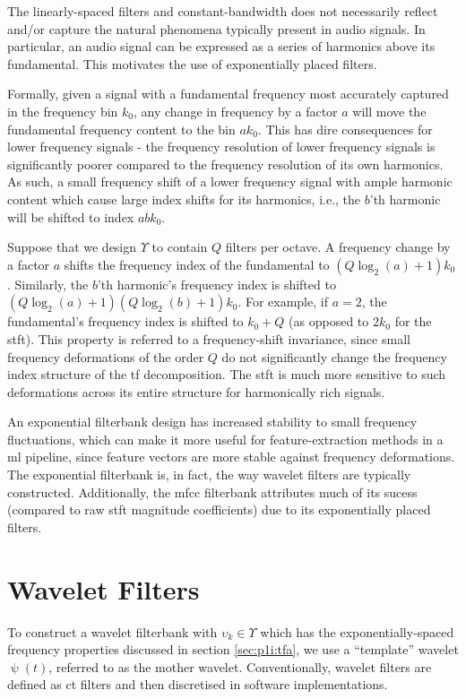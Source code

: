 The linearly-spaced filters and constant-bandwidth does not necessarily reflect and/or capture the natural phenomena typically present in audio signals. In particular, an audio signal can be expressed as a series of harmonics above its fundamental. This motivates the use of exponentially placed filters.

Formally, given a signal with a fundamental frequency most accurately captured in the frequency bin $k_0$, any change in frequency by a factor $a$ will move the fundamental frequency content to the bin $a k_0$. This has dire consequences for lower frequency signals - the frequency resolution of lower frequency signals is significantly poorer compared to the frequency resolution of its own harmonics. As such, a small frequency shift of a lower frequency signal with ample harmonic content which cause large index shifts for its harmonics, i.e., the $b$'th harmonic will be shifted to index $a b k_0$.

Suppose that we design $\Upsilon$ to contain $Q$ filters per octave. A frequency change by a factor $a$ shifts the frequency index of the fundamental to $(Q\log_2 (a) + 1) k_0$. Similarly, the $b$'th harmonic's frequency index is shifted to $(Q\log_2 (a) + 1) (Q\log_2 (b) + 1) k_0$. For example, if $a=2$, the fundamental's frequency index is shifted to $k_0 + Q$ (as opposed to $2 k_0$ for the \ac{stft}). This property is referred to a frequency-shift invariance, since small frequency deformations of the order $Q$ do not significantly change the frequency index structure of the \ac{tf} decomposition. The \ac{stft} is much more sensitive to such deformations across its entire structure for harmonically rich signals.

An exponential filterbank design has increased stability to small frequency fluctuations, which can make it more useful for feature-extraction methods in a \ac{ml} pipeline, since feature vectors are more stable against frequency deformations. The exponential filterbank is, in fact, the way wavelet filters are typically constructed. Additionally, the \ac{mfcc} filterbank attributes much of its sucess (compared to raw \ac{stft} magnitude coefficients) due to its exponentially placed filters.

\section{Wavelet Filters}
\label{sec:p1i:wavelets}

To construct a wavelet filterbank with $\upsilon_k \in \Upsilon$ which has the exponentially-spaced frequency properties discussed in section \ref{sec:p1i:tfa}, we use a ``template'' wavelet $\uppsi(t)$, referred to as the mother wavelet. Conventionally, wavelet filters are defined as \ac{ct} filters and then discretised in software implementations. 

